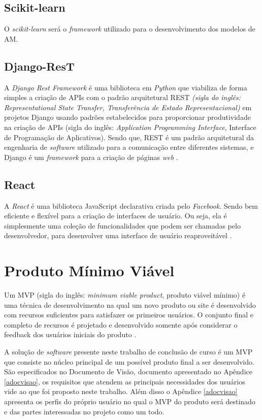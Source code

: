 \subsection{Scikit-learn}
O \textit{scikit-learn} será o \textit{framework} utilizado para o desenvolvimento dos modelos de AM.
\subsection{Django-ResT}

A \textit{Django Rest Framework} é uma biblioteca em \textit{Python} que viabiliza de forma simples a criação de APIs com o padrão arquitetural REST \textit{(sigla do inglês: Representational State Transfer, Transferência de Estado Representacional)} em projetos Django usando padrões estabelecidos para proporcionar produtividade na criação de APIs (sigla do inglês: \textit{Application Programming Interface}, Interface de Programação de Aplicativos). Sendo que, REST é um padrão arquitetural da engenharia de \textit{software} utilizado para a comunicação entre diferentes sistemas, e Django é um \textit{framework} para a criação de páginas \textit{web} \cite{christie2011django}.

\subsection{React}

A \textit{React} é uma biblioteca JavaScript declarativa criada pelo \textit{Facebook}. Sendo bem eficiente e flexível para a criação de interfaces de usuário. Ou seja, ela é simplesmente uma coleção de funcionalidades que podem ser chamadas pelo desenvolvedor, para desenvolver uma interface de usuário reaproveitável \cite{reactjs}.

\section{Produto Mínimo Viável}

Um MVP (sigla do inglês: \textit{minimum viable product}, produto viável mínimo) é uma técnica de desenvolvimento na qual um novo produto ou site é desenvolvido com recursos suficientes para satisfazer os primeiros usuários. O conjunto final e completo de recursos é projetado e desenvolvido somente após considerar o feedback dos usuários iniciais do produto \cite{MVP}.

A solução de \textit{software} presente neste trabalho de conclusão de curso é um MVP que consiste no núcleo principal de um possível produto final a ser desenvolvido. São especificados no Documento de Visão, documento apresentado no Apêndice \ref{adocvisao}, os requisitos que atendem as principais necessidades dos usuários vide ao que foi proposto neste trabalho. Além disso o Apêndice \ref{adocvisao} apresenta os perfis do próprio usuário no qual o MVP do produto será destinado e das partes interessadas no projeto como um todo.
